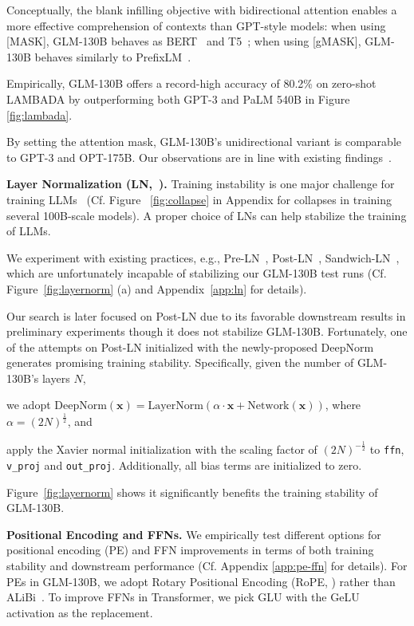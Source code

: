 Conceptually, the blank infilling objective with bidirectional attention enables a more effective comprehension of contexts than GPT-style models: when using [MASK], GLM-130B behaves as BERT~\citep{devlin2019bert} and T5~\citep{raffel2020exploring}; when using [gMASK], GLM-130B behaves similarly to PrefixLM~\citep{liu2018generating,dong2019unified}.

Empirically, GLM-130B offers a record-high accuracy of 80.2\% on zero-shot LAMBADA  by outperforming both GPT-3 and PaLM 540B in Figure \ref{fig:lambada}. 

By setting the attention mask, GLM-130B's  unidirectional variant is comparable to GPT-3 and OPT-175B. Our observations are in line with existing findings~\citep{liu2018generating,dong2019unified}. 

\textbf{Layer Normalization (LN,~\cite{ba2016layer}).} Training instability is one major challenge for training LLMs~\citep{zhang2022opt,scao2022what,chowdhery2022palm} (Cf. Figure ~\ref{fig:collapse} in Appendix for  collapses in training several 100B-scale models). A proper choice of LNs can help stabilize the training of LLMs. 

We experiment with existing practices, e.g., Pre-LN~\citep{xiong2020layer}, Post-LN~\citep{ba2016layer}, Sandwich-LN~\citep{ding2021cogview}, which are unfortunately incapable of stabilizing our GLM-130B test runs (Cf. Figure~\ref{fig:layernorm} (a) and Appendix~\ref{app:ln} for details). 

Our search is later focused on Post-LN due to its favorable downstream results in preliminary experiments though it does not stabilize GLM-130B. Fortunately, one of the attempts on Post-LN initialized with the newly-proposed DeepNorm~\citep{wang2022deepnet} generates promising training stability. Specifically, given the number of GLM-130B's layers $N$, 

    we adopt $\textrm{DeepNorm}(\boldsymbol{x}) = \textrm{LayerNorm}(\alpha\cdot \boldsymbol{x} + \textrm{Network}(\boldsymbol{x}))$, where $\alpha=(2N)^\frac{1}{2}$, 
    and 

   apply the Xavier normal initialization with the scaling factor of $(2N)^{-\frac{1}{2}}$ to \texttt{ffn}, \texttt{v\_proj} and \texttt{out\_proj}. Additionally, all bias terms are initialized to zero.

Figure~\ref{fig:layernorm} shows it significantly benefits the training stability of GLM-130B. 

\textbf{Positional Encoding and FFNs.} We empirically test different options for positional encoding (PE) and FFN improvements in terms of both training stability and downstream performance (Cf. Appendix \ref{app:pe-ffn} for details). For PEs in GLM-130B, we adopt Rotary Positional Encoding (RoPE, \cite{su2021roformer}) rather than  ALiBi~\citep{press2021train}. To improve FFNs in Transformer, we pick GLU with the GeLU~\citep{hendrycks2016gaussian} activation as the replacement.

